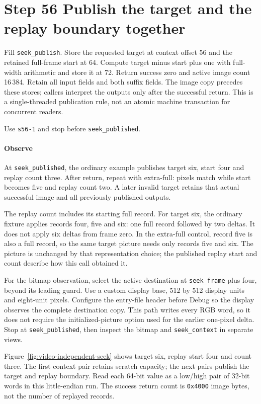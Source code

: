 \section{Step 56 Publish the target and the replay boundary together}
Fill \texttt{seek\_publish}. Store the requested target at context offset 56 and the retained full-frame start at 64. Compute target minus start plus one with full-width arithmetic and store it at 72. Return success zero and active image count 16\,384. Retain all input fields and both suffix fields. The image copy precedes these stores; callers interpret the outputs only after the successful return. This is a single-threaded publication rule, not an atomic machine transaction for concurrent readers.

Use \texttt{s56-1} and stop before \texttt{seek\_published}.

\paragraph{Observe} At \texttt{seek\_published}, the ordinary example publishes target six, start four and replay count three. After return, repeat with extra-full: pixels match while start becomes five and replay count two. A later invalid target retains that actual successful image and all previously published outputs.

The replay count includes its starting full record. For target six, the ordinary
fixture applies records four, five and six: one full record followed by two deltas.
It does not apply six deltas from frame zero. In the extra-full control, record five
is also a full record, so the same target picture needs only records five and six.
The picture is unchanged by that representation choice; the published replay start
and count describe how this call obtained it.

For the bitmap observation, select the active destination at
\texttt{seek\_frame} plus four, beyond its leading guard. Use a custom display base,
512 by 512 display units and eight-unit pixels. Configure the entry-file header
before Debug so the display observes the complete destination copy. This path writes
every RGB word, so it does not require the initialized-picture option used for the
earlier one-pixel delta. Stop at \texttt{seek\_published}, then inspect the bitmap
and \texttt{seek\_context} in separate views.

Figure~\ref{fig:video-independent-seek} shows target six, replay start four and
count three. The first context pair retains scratch capacity; the next pairs publish
the target and replay boundary. Read each 64-bit value as a low/high pair of 32-bit
words in this little-endian run. The success return count is \texttt{0x4000} image
bytes, not the number of replayed records.

